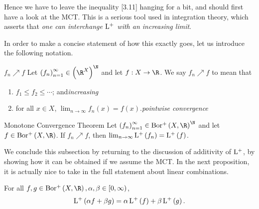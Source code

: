 \documentclass[pmath450]{subfiles}
\begin{document}
    Hence we have to leave the inequality [3.11] hanging for a bit, and should first have a look at the MCT. This is a serious tool used in integration theory, which asserts that \textit{one can interchange $\operatorname{L^+}$ with an increasing limit}.

    In order to make a concise statement of how this exactly goes, let us introduce the following notation.

    \begin{notation}{$f_n\nearrow f$}
        Let $\left( f_{n} \right)^{\infty}_{n=1}\in\left( \R^{X} \right)^{\N}$ and let $f:X\to\R$. We say $f_n\nearrow f$ to mean that
        \begin{enumerate}
            \item $f_1\leq f_2\leq\cdots$; and\hfill\textit{increasing}
            \item for all $x\in X$, $\lim_{n\to\infty}f_n\left( x \right)=f\left( x \right)$.\hfill\textit{pointwise convergence}
        \end{enumerate}
    \end{notation}

    \begin{theorem}{Monotone Convergence Theorem}
        Let $\left( f_{n} \right)^{\infty}_{n=1}\in\borplus\left( X,\R \right)^{\N}$ and let $f\in\borplus\left( X,\R \right)$. If $f_n\nearrow f$, then $\lim_{n\to\infty}\operatorname{L^+}\left( f_n \right)=\operatorname{L^+}\left( f \right)$.
    \end{theorem}


    \np We conclude this subsection by returning to the discussion of additivity of $\operatorname{L^+}$, by showing how it can be obtained if we assume the MCT. In the next proposition, it is actually nice to take in the full statement about linear combinations.

    \begin{prop}{}
        For all $f,g\in\borplus\left( X,\R \right), \alpha,\beta\in\left[ 0,\infty \right)$,
        \begin{equation*}
            \operatorname{L^+}\left( \alpha f+\beta g \right) = \alpha\operatorname{L^+}\left( f \right)+\beta\operatorname{L^+}\left( g \right).
        \end{equation*}
    \end{prop}
\end{document}
